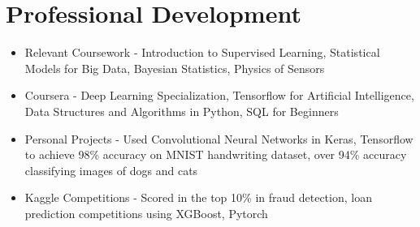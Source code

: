 \documentclass[a4paper,10pt]{article}
\begin{document}
\section{Professional Development}
\begin{itemize}[leftmargin=*, topsep=2pt]
    \setlength\itemsep{-0.25em}
    \item Relevant Coursework - Introduction to Supervised Learning, Statistical Models for Big Data, Bayesian Statistics, Physics of Sensors
    \item Coursera - Deep Learning Specialization, Tensorflow for Artificial Intelligence, Data Structures and Algorithms in Python, SQL for Beginners 
    \item Personal Projects - Used Convolutional Neural Networks in Keras, Tensorflow to achieve 98\% accuracy on MNIST handwriting dataset, over 94\% accuracy classifying images of dogs and cats
    \item Kaggle Competitions - Scored in the top 10\% in fraud detection,  loan prediction competitions using XGBoost, Pytorch
\end{itemize}
\end{document}
